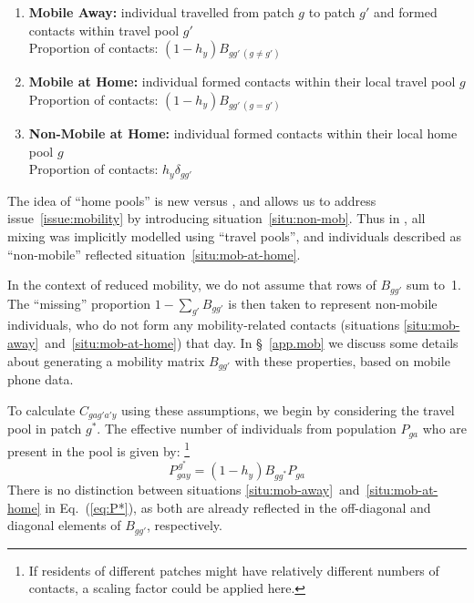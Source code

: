 \begin{enumerate}
  \item \textbf{Mobile Away:}\label{situ:mob-away}
  individual travelled from patch $g$ to patch $g'$ and formed contacts within travel pool $g'$\\
  Proportion of contacts: $(1-h_y) B_{gg' \, (g \ne g')}$
  \item \textbf{Mobile at Home:}\label{situ:mob-at-home}
  individual formed contacts within their local travel pool $g$\\
  Proportion of contacts: $(1-h_y) B_{gg' \, (g = g')}$
  \item \textbf{Non-Mobile at Home:}\label{situ:non-mob}
  individual formed contacts within their local home pool $g$\\
  Proportion of contacts: $h_y \delta_{gg'}$
\end{enumerate}
The idea of ``home pools'' is new versus \cite{Arenas2020},
and allows us to address issue~\ref{issue:mobility}
by introducing situation~\ref{situ:non-mob}.
Thus in \cite{Arenas2020}, all mixing was implicitly modelled using ``travel pools'',
and individuals described as ``non-mobile'' reflected situation~\ref{situ:mob-at-home}.
\par
In the context of reduced mobility, we do not assume that rows of $B_{gg'}$ sum to~1.
The ``missing'' proportion $1 - \sum_{g'} B_{gg'}$ is then taken to represent
non-mobile individuals, who do not form any mobility-related contacts
(situations \ref{situ:mob-away}~and~\ref{situ:mob-at-home}) that day.
In \S~\ref{app.mob} we discuss some details about
generating a mobility matrix $B_{gg'}$ with these properties, based on mobile phone data.
\par
To calculate $C_{gag'a'y}$ using these assumptions,
we begin by considering the travel pool in patch $g^*$.
The effective number of individuals from population $P_{ga}$
who are present in the pool is given by:%
\footnote{If residents of different patches might have relatively different numbers of contacts,
  a scaling factor could be applied here.}
\begin{equation}\label{eq:P*}
  P^{\,g^*}_{gay} = (1-h_y) B_{gg^*} P_{ga}
\end{equation}
There is no distinction between situations \ref{situ:mob-away}~and~\ref{situ:mob-at-home}
in Eq.~(\ref{eq:P*}),
as both are already reflected in the off-diagonal and diagonal elements of $B_{gg'}$, respectively.

